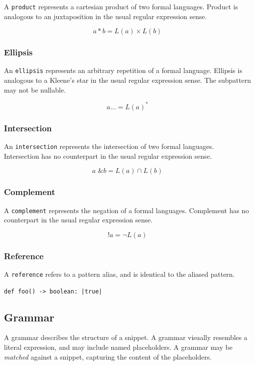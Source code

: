 \documentclass{article}
\begin{document}
A \texttt{product} represents a cartesian product of two formal languages. Product is analogous
to an juxtaposition in the usual regular expression sense.

\[a * b = L\left(a\right) \times L\left(b\right)\]

\subsubsection{Ellipsis}

An \texttt{ellipsis} represents an arbitrary repetition of a formal language.
Ellipsis is analogous to a Kleene's star in the usual regular expression sense.
The subpattern may not be nullable.

\[a... = L\left(a\right)^{*}\]

\subsubsection{Intersection}

An \texttt{intersection} represents the intersection of two formal languages.
Intersection has no counterpart in the usual regular expression sense.

\[a \text{ \& } b = L\left(a\right) \cap L\left(b\right)\]

\subsubsection{Complement}

A \texttt{complement} represents the negation of a formal languages.
Complement has no counterpart in the usual regular expression sense.

\[!a = \neg L\left(a\right)\]

\subsubsection{Reference}

A \texttt{reference} refers to a pattern alias, and is identical to the aliased pattern.


\begin{center}
    \verb/def foo() -> boolean: |true|/
\end{center}

\subsection{Grammar}

A grammar describes the structure of a snippet. A grammar visually resembles a literal expression,
and may include named placeholders. A grammar may be \emph{matched} against a snippet, capturing
the content of the placeholders.
\end{document}
